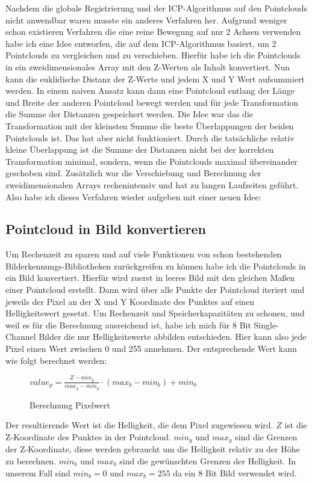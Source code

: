 \documentclass[../main.tex]{subfiles}
\begin{document}
Nachdem die globale Registrierung und der ICP-Algorithmus auf den Pointclouds nicht
anwendbar waren musste ein anderes Verfahren her. Aufgrund weniger schon existieren 
Verfahren die eine reine Bewegung auf nur 2 Achsen verwenden habe ich eine Idee 
entworfen, die auf dem ICP-Algorithmus basiert, um 2 Pointclouds zu vergleichen 
und zu verschieben. Hierfür habe ich die Pointclouds in ein zweidimensionales Array
mit den Z-Werten als Inhalt konvertiert. Nun kann die euklidische Distanz der Z-Werte
und jedem X und Y Wert aufsummiert werden. In einem naiven Ansatz kann dann eine 
Pointcloud entlang der Länge und Breite der anderen Pointcloud bewegt werden und für 
jede Transformation die Summe der Distanzen gespeichert werden. Die Idee war das die 
Transformation mit der kleinsten Summe die beste Überlappungen der beiden Pointclouds 
ist. Das hat aber nicht funktioniert. Durch die tatsächliche relativ kleine Überlappung 
ist die Summe der Distanzen nicht bei der korrekten Transformation minimal, 
sondern, wenn die Pointclouds maximal übereinander geschoben sind. Zusätzlich war die 
Verschiebung und Berechnung der zweidimensionalen Arrays rechenintensiv und hat zu 
langen Laufzeiten geführt. Also habe ich dieses Verfahren wieder aufgeben mit einer neuen
Idee:

\subsection*{Pointcloud in Bild konvertieren}
Um Rechenzeit zu sparen und auf viele Funktionen von schon bestehenden 
Bilderkennungs-Bibliotheken zurückgreifen zu können habe ich die Pointclouds in ein
Bild konvertiert. Hierfür wird zuerst in leeres Bild mit den gleichen Maßen einer 
Pointcloud erstellt. Dann wird über alle Punkte der Pointcloud iteriert und jeweils
der Pixel an der X und Y Koordinate des Punktes auf einen Helligkeitswert gesetzt.
Um Rechenzeit und Speicherkapazitäten zu schonen, und weil es für die Berechnung 
ausreichend ist, habe ich mich für 8 Bit Single-Channel Bilder die nur Helligkeitswerte 
abbilden entschieden. Hier kann also jede Pixel einen Wert zwischen 0 und 255 annehmen.
Der entsprechende Wert kann wie folgt berechnet werden:

\begin{figure}
    \centering
    $value_p = \frac{Z - min_y}{max_y - min_y} \cdot (max_b - min_b) + min_b$
    \caption{Berechnung Pixelwert}
    \label{calc:brightness}
\end{figure}
Der resultierende Wert ist die Helligkeit, die dem Pixel zugewiesen wird.
$Z$ ist die Z-Koordinate des Punktes in der Pointcloud. $min_y$ und $max_y$ sind 
die Grenzen der Z-Koordinate, diese werden gebraucht um die Helligkeit relativ 
zu der Höhe zu berechnen. $min_b$ und $max_b$ sind die gewünschten Grenzen der 
Helligkeit. In unserem Fall sind $min_b = 0$ und $max_b = 255$ da ein 8 Bit Bild
verwendet wird.
\end{document}
